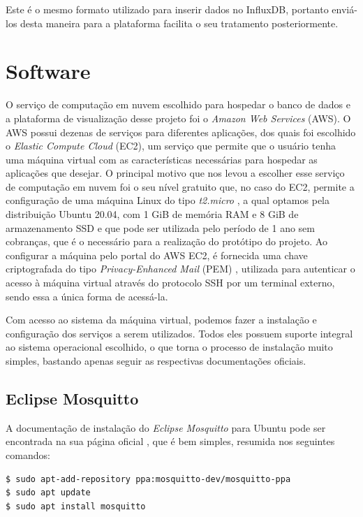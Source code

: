\documentclass[../monografia.tex]{subfiles}
\begin{document}
Este é o mesmo formato utilizado para inserir dados no InfluxDB, portanto enviá-los desta maneira para a plataforma facilita o seu tratamento posteriormente.


\section{Software}

O serviço de computação em nuvem escolhido para hospedar o banco de dados e a plataforma de visualização desse projeto foi o \textit{Amazon Web Services} (AWS). O AWS possui dezenas de serviços para diferentes aplicações, dos quais foi escolhido o \textit{Elastic Compute Cloud} (EC2), um serviço que permite que o usuário tenha uma máquina virtual com as características necessárias para hospedar as aplicações que desejar. O principal motivo que nos levou a escolher esse serviço de computação em nuvem foi o seu nível gratuito que, no caso do EC2, permite a configuração de uma máquina Linux do tipo \textit{t2.micro} \cite{aws-ec2-t2}, a qual optamos pela distribuição Ubuntu 20.04, com 1 GiB de memória RAM e 8 GiB de armazenamento SSD e que pode ser utilizada pelo período de 1 ano sem cobranças, que é o necessário para a realização do protótipo do projeto. Ao configurar a máquina pelo portal do AWS EC2, é fornecida uma chave criptografada do tipo \textit{Privacy-Enhanced Mail} (PEM) \cite{rfc1424}, utilizada para autenticar o acesso à máquina virtual através do protocolo SSH por um terminal externo, sendo essa a única forma de acessá-la. 

Com acesso ao sistema da máquina virtual, podemos fazer a instalação e configuração dos serviços a serem utilizados. Todos eles possuem suporte integral ao sistema operacional escolhido, o que torna o processo de instalação muito simples, bastando apenas seguir as respectivas documentações oficiais. 


\subsection{Eclipse Mosquitto}

A documentação de instalação do \textit{Eclipse Mosquitto} para Ubuntu pode ser encontrada na sua página oficial \cite{mosquitto}, que é bem simples, resumida nos seguintes comandos:

\begin{lstlisting}[language=bash, basicstyle=\ttfamily]
$ sudo apt-add-repository ppa:mosquitto-dev/mosquitto-ppa
$ sudo apt update
$ sudo apt install mosquitto
\end{lstlisting}
\end{document}
